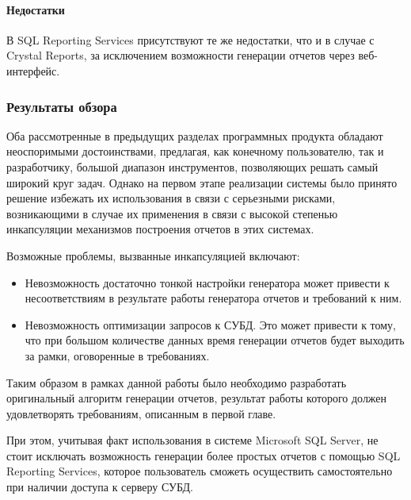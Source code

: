 \paragraph{Недостатки} В SQL Reporting Services присутствуют те же недостатки, что и в случае
с Crystal Reports, за исключением возможности генерации отчетов через веб-интерфейс.

\subsubsection{Результаты обзора}
Оба рассмотренные в предыдущих разделах программных продукта 
обладают неоспоримыми достоинствами, предлагая, как конечному пользователю, так и разработчику,
большой диапазон инструментов, позволяющих решать самый широкий круг задач.
Однако на первом этапе реализации системы было принято решение избежать их использования
в связи с серьезными рисками, возникающими в случае их применения в связи с
высокой степенью инкапсуляции механизмов построения отчетов в этих системах.

Возможные проблемы, вызванные инкапсуляцией включают:
\begin{itemize}
\item{
Невозможность достаточно тонкой настройки генератора может привести к несоответствиям в результате
работы генератора отчетов и требований к ним.
}
\item{
Невозможность оптимизации запросов к СУБД. Это может привести к тому, что при большом количестве данных
время генерации отчетов будет выходить за рамки, оговоренные в требованиях.
}
\end{itemize}

Таким образом в рамках данной работы было необходимо разработать оригинальный 
алгоритм генерации отчетов, результат работы которого должен удовлетворять требованиям,
описанным в первой главе.

При этом, учитывая факт использования в системе Microsoft SQL Server, не стоит исключать
возможность генерации более простых отчетов с помощью SQL Reporting Services, которое
пользователь сможеть осуществить самостоятельно при наличии доступа к серверу СУБД.



